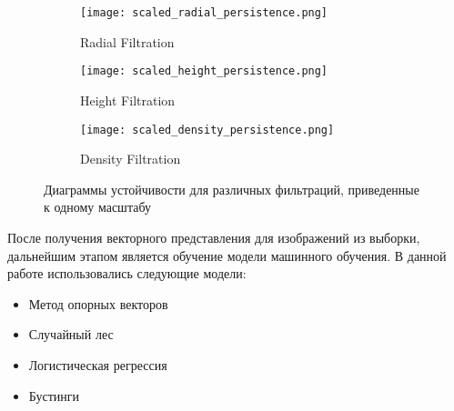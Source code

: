 \begin{figure}[!htbp]
	\begin{subfigure}{.33\textwidth}
		\centering
		\texttt{[image: scaled\_radial\_persistence.png]}\\
		\caption{Radial Filtration}
	\end{subfigure}%
	\begin{subfigure}{.33\textwidth}
		\centering
		\texttt{[image: scaled\_height\_persistence.png]}\\
		\caption{Height Filtration}
	\end{subfigure}%
	\begin{subfigure}{.33\textwidth}
		\centering
		\texttt{[image: scaled\_density\_persistence.png]}\\
		\caption{Density Filtration}
	\end{subfigure}%
	\caption{Диаграммы устойчивости для различных фильтраций, приведенные к одному масштабу}
	\label{scaled_persistences}
\end{figure}

После получения векторного представления для изображений из выборки, дальнейшим этапом является обучение модели машинного обучения. В данной работе использовались следующие модели:
\begin{itemize}
	\item Метод опорных векторов
	\item Случайный лес
	\item Логистическая регрессия
	\item Бустинги
\end{itemize}
